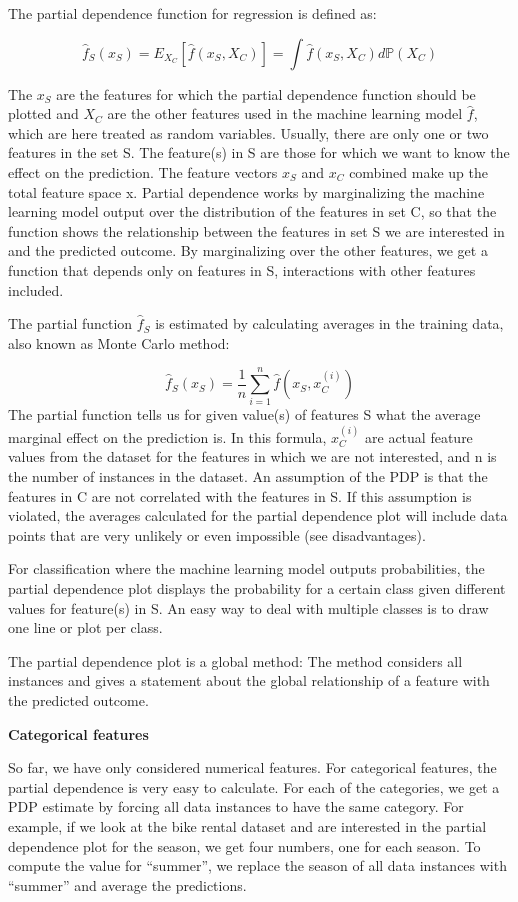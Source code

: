 \documentclass[
  11pt,
]{scrbook}
\begin{document}
The partial dependence function for regression is defined as:

\[\hat{f}_S(x_S)=E_{X_C}\left[\hat{f}(x_S,X_C)\right]=\int\hat{f}(x_S,X_C)d\mathbb{P}(X_C)\]

The \(x_S\) are the features for which the partial dependence function should be plotted and \(X_C\) are the other features used in the machine learning model \(\hat{f}\), which are here treated as random variables.
Usually, there are only one or two features in the set S.
The feature(s) in S are those for which we want to know the effect on the prediction.
The feature vectors \(x_S\) and \(x_C\) combined make up the total feature space x.
Partial dependence works by marginalizing the machine learning model output over the distribution of the features in set C, so that the function shows the relationship between the features in set S we are interested in and the predicted outcome.
By marginalizing over the other features, we get a function that depends only on features in S, interactions with other features included.

The partial function \(\hat{f}_S\) is estimated by calculating averages in the training data, also known as Monte Carlo method:

\[\hat{f}_S(x_S)=\frac{1}{n}\sum_{i=1}^n\hat{f}(x_S,x^{(i)}_{C})\]
The partial function tells us for given value(s) of features S what the average marginal effect on the prediction is.
In this formula, \(x^{(i)}_{C}\) are actual feature values from the dataset for the features in which we are not interested, and n is the number of instances in the dataset.
An assumption of the PDP is that the features in C are not correlated with the features in S.
If this assumption is violated, the averages calculated for the partial dependence plot will include data points that are very unlikely or even impossible (see disadvantages).

For classification where the machine learning model outputs probabilities, the partial dependence plot displays the probability for a certain class given different values for feature(s) in S.
An easy way to deal with multiple classes is to draw one line or plot per class.

The partial dependence plot is a global method:
The method considers all instances and gives a statement about the global relationship of a feature with the predicted outcome.

\textbf{Categorical features}

So far, we have only considered numerical features.
For categorical features, the partial dependence is very easy to calculate.
For each of the categories, we get a PDP estimate by forcing all data instances to have the same category.
For example, if we look at the bike rental dataset and are interested in the partial dependence plot for the season, we get four numbers, one for each season.
To compute the value for ``summer'', we replace the season of all data instances with ``summer'' and average the predictions.
\end{document}
